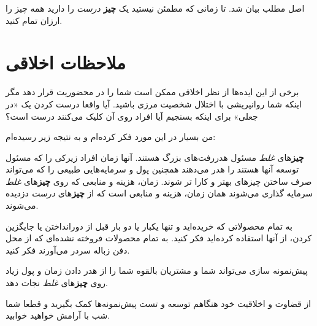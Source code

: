 اصل مطلب بیان شد. تا زمانی که مطمئن نیستید یک \textbf{چیز} \emph{درست}
را دارید همه چیز را ارزان تمام کنید.

\section{ملاحظات
اخلاقی}\label{ux645ux644ux627ux62dux638ux627ux62a-ux627ux62eux644ux627ux642ux6cc}

برخی از این ایده‌ها از نظر اخلاقی ممکن است شما را در محضوریت قرار دهد
مگر اینکه شما روانپریشی با اختلال شخصیت مرزی باشید. آیا واقعا درست کردن
یک «در جعلی» برای اینکه بسنجیم آیا افراد روی آن کلیک می‌کنند درست است؟

من بسیار در این مورد فکر کرده‌ام و به نتیجه زیر رسیده‌ام:

\textbf{چیز}های \emph{غلط} مسئول هدررفت‌های بزرگ هستند. آنها زمان افراد
زیرکی را که مسئول توسعه آنها هستند را هدر می‌دهند همچنین پول و
سرمایه‌هایی طبیعی را که می‌تواند صرف ساختن چیزهای بهتر و کارا تر شوند.
زمان، هزینه و منابعی که روی \textbf{چیز}های \emph{غلط} سرمایه گذاری
می‌شوند همان زمان، هزینه و منابعی است که از \textbf{چیز}های \emph{درست}
دزدیده می‌شوند.

به تمام محصولاتی که خریده‌اید و تنها یکبار یا دو بار قبل از دورانداختن
یا جایگزین کردن، از آنها استفاده کرده‌اید فکر کنید. به تمام محصولات
فروخته نشده‌ای که از محل دفن زباله سردر می‌آورند فکر کنید.

پیش‌نمونه سازی می‌تواند شما و مشتریان بالقوه شما را از هدر دادن زمان و
پول زیاد روی \textbf{چیز}های \emph{غلط} نجات دهد.

از قضاوت و اخلاقیت خود هنگاهم توسعه و تست پیش‌نمونه‌ها کمک بگیرید و قطعا
شما شب با آرامش خواهید خوابید.

